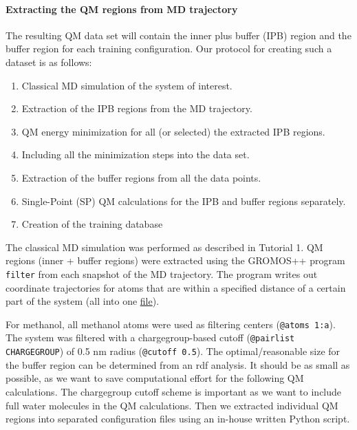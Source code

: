 \paragraph{Extracting the QM regions from MD trajectory}
The resulting QM data set will contain the inner plus buffer (IPB) region and the buffer region for each training configuration. Our protocol for creating such a dataset is as follows: 
\begin{enumerate}
    \item Classical MD simulation of the system of interest.
    \item Extraction of the IPB regions from the MD trajectory.
    \item QM energy minimization for all (or selected) the extracted IPB regions.
    \item Including all the minimization steps into the data set.
    \item Extraction of the buffer regions from all the data points.
    \item Single-Point (SP) QM calculations for the IPB and buffer regions separately.
    \item Creation of the training database
\end{enumerate}
The classical MD simulation was performed as described in Tutorial 1. QM regions (inner + buffer regions) were extracted using the GROMOS++ program \texttt{filter} from each snapshot of the MD trajectory. The program writes out coordinate trajectories for atoms that are within a specified distance of a certain part of the system (all into one \href{https://github.com/LierB/gromos_tutorial_livecoms/blob/burnn_tutorial_rc/tutorial_files/t_06/train_dataset_tutorial/filter/filter_output_example.cnf}{file}).

For methanol, all methanol atoms were used as filtering centers (\texttt{@atoms 1:a}). The system was filtered with a chargegroup-based cutoff (\texttt{@pairlist CHARGEGROUP}) of 0.5 nm radius (\texttt{@cutoff 0.5}). The optimal/reasonable size for the buffer region can be determined from an rdf analysis. It should be as small as possible, as we want to save computational effort for the following QM calculations. The chargegroup cutoff scheme is important as we want to include full water molecules in the QM calculations. Then we extracted individual QM regions into separated configuration files using an in-house written Python script.

